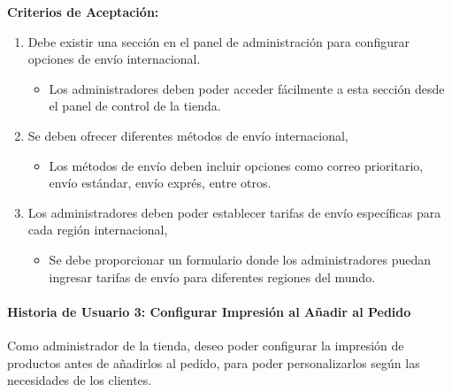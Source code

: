 \documentclass[12pt]{article}
\newcommand{\subsubsubsection}[1]{\paragraph{#1}}
\begin{document}
\vspace{0.5cm}
\textbf{Criterios de Aceptación:}
\begin{enumerate}[label=\arabic*.]
    \item Debe existir una sección en el panel de administración para configurar opciones de envío internacional.
          \begin{itemize}[label=--]
              \item Los administradores deben poder acceder fácilmente a esta sección desde el panel de control de la tienda.
          \end{itemize}
    \item Se deben ofrecer diferentes métodos de envío internacional,
          \begin{itemize}[label=--]
              \item Los métodos de envío deben incluir opciones como correo prioritario, envío estándar, envío exprés, entre otros.
          \end{itemize}
    \item Los administradores deben poder establecer tarifas de envío específicas para cada región internacional,
          \begin{itemize}[label=--]
              \item Se debe proporcionar un formulario donde los administradores puedan ingresar tarifas de envío para diferentes regiones del mundo.
          \end{itemize}
\end{enumerate}


\subsubsubsection{Historia de Usuario 3: Configurar Impresión al Añadir al Pedido}\label{sec:historia3}

Como administrador de la tienda, deseo poder configurar la impresión de productos antes de añadirlos al pedido, para poder personalizarlos según las necesidades de los clientes.
\end{document}
